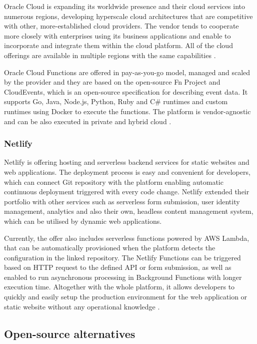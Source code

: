 Oracle Cloud is expanding its worldwide presence and their cloud services into numerous regions, developing hyperscale cloud architectures that are competitive with other, more-established cloud providers. The vendor tends to cooperate more closely with enterprises using its business applications and enable to incorporate and integrate them within the cloud platform. All of the cloud offerings are available in multiple regions with the same capabilities \cite{Gartner}.

Oracle Cloud Functions are offered in pay-as-you-go model, managed and scaled by the provider and they are based on the open-source Fn Project and CloudEvents, which is an open-source specification for describing event data. It supports Go, Java, Node.js, Python, Ruby and C\# runtimes and custom runtimes using Docker to execute the functions. The platform is vendor-agnostic and can be also executed in private and hybrid cloud \cite{FnProject}.

\subsubsection*{Netlify}

Netlify is offering hosting and serverless backend services for static websites and web applications. The deployment process is easy and convenient for developers, which can connect Git repository with the platform enabling automatic continuous deployment triggered with every code change. Netlify extended their portfolio with other services such as serverless form submission, user identity management, analytics and also their own, headless content management system, which can be utilised by dynamic web applications.

Currently, the offer also includes serverless functions powered by AWS Lambda, that can be automatically provisioned when the platform detects the configuration in the linked repository. The Netlify Functions can be triggered based on HTTP request to the defined API or form submission, as well as enabled to run asynchronous processing in Background Functions with longer execution time. Altogether with the whole platform, it allows developers to quickly and easily setup the production environment for the web application or static website without any operational knowledge \cite{NetlifyFunction}.

\subsection{Open-source alternatives}

